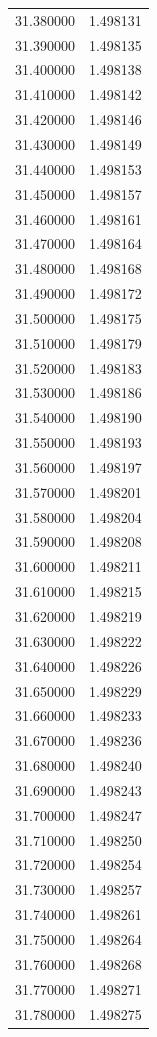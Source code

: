 \begin{tabular}{rr}
31.380000 & 1.498131 \\
31.390000 & 1.498135 \\
31.400000 & 1.498138 \\
31.410000 & 1.498142 \\
31.420000 & 1.498146 \\
31.430000 & 1.498149 \\
31.440000 & 1.498153 \\
31.450000 & 1.498157 \\
31.460000 & 1.498161 \\
31.470000 & 1.498164 \\
31.480000 & 1.498168 \\
31.490000 & 1.498172 \\
31.500000 & 1.498175 \\
31.510000 & 1.498179 \\
31.520000 & 1.498183 \\
31.530000 & 1.498186 \\
31.540000 & 1.498190 \\
31.550000 & 1.498193 \\
31.560000 & 1.498197 \\
31.570000 & 1.498201 \\
31.580000 & 1.498204 \\
31.590000 & 1.498208 \\
31.600000 & 1.498211 \\
31.610000 & 1.498215 \\
31.620000 & 1.498219 \\
31.630000 & 1.498222 \\
31.640000 & 1.498226 \\
31.650000 & 1.498229 \\
31.660000 & 1.498233 \\
31.670000 & 1.498236 \\
31.680000 & 1.498240 \\
31.690000 & 1.498243 \\
31.700000 & 1.498247 \\
31.710000 & 1.498250 \\
31.720000 & 1.498254 \\
31.730000 & 1.498257 \\
31.740000 & 1.498261 \\
31.750000 & 1.498264 \\
31.760000 & 1.498268 \\
31.770000 & 1.498271 \\
31.780000 & 1.498275 \\

\end{tabular}
